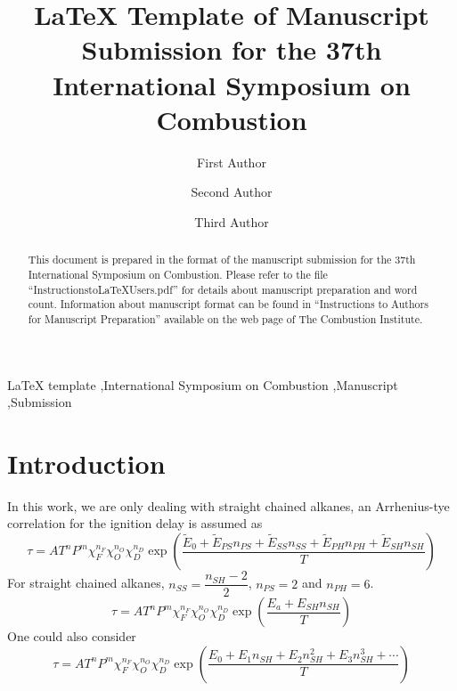 \documentclass[preprint,review,12pt]{elsarticle}
\newcommand{\bkt}[1]{\left(#1\right)}
\begin{document}
\begin{frontmatter}

\title{LaTeX Template of Manuscript Submission for the 37th International Symposium on Combustion }

\author[fir]{First Author}

\author[sec]{Second Author}
\author[fir]{Third Author}

\address[fir]{First affiliation, Address, City and Postcode, Country}
\address[sec]{Second affiliation, Address, City and Postcode, Country}

\begin{abstract}

This document is prepared in the format of the manuscript submission for the 37th International Symposium on Combustion. Please refer to the file ``InstructionstoLaTeXUsers.pdf'' for details about manuscript preparation and word count. Information about manuscript format can be found in ``Instructions to Authors for Manuscript Preparation'' available on the web page of The Combustion Institute. 
\end{abstract}

\begin{keyword}

LaTeX template \sep International Symposium on Combustion \sep Manuscript \sep Submission 

\end{keyword}

\end{frontmatter}


\ifdefined \wordcount
\clearpage
\fi

\section{Introduction}
In this work, we are only dealing with straight chained alkanes, an Arrhenius-tye correlation for the ignition delay is assumed as
$$\tau = A T^{n} P^{m} \chi_F^{n_F} \chi_O^{n_O} \chi_D^{n_D} \exp\bkt{\dfrac{\tilde{E}_0 + \tilde{E}_{PS}n_{PS} + \tilde{E}_{SS}n_{SS} + \tilde{E}_{PH}n_{PH} + \tilde{E}_{SH}n_{SH}}T}$$
For straight chained alkanes, $n_{SS} = \dfrac{n_{SH}-2}2$, $n_{PS} = 2$ and $n_{PH} = 6$.
$$\tau = A T^{n} P^{m} \chi_F^{n_F} \chi_O^{n_O} \chi_D^{n_D} \exp\bkt{\dfrac{E_a + E_{SH}n_{SH}}T}$$
One could also consider
$$\tau = A T^{n} P^{m} \chi_F^{n_F} \chi_O^{n_O} \chi_D^{n_D} \exp\bkt{\dfrac{E_0 + E_1n_{SH} + E_2n_{SH}^2 + E_3n_{SH}^3 + \cdots}T}$$
\label{Introduction}
\end{document}
